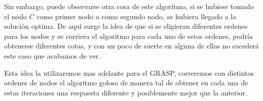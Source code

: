 Sin embargo, puede observarse otra cosa de este algoritmo, si se hubiese tomado el nodo $C$ como primer nodo o como segundo nodo, se hubiera llegado a la solución optima. De aquí surge la idea de que si se eligieran diferentes ordenes para los nodos y se corriera el algoritmo para cada uno de estos ordenes, podría obtenerse diferentes cotas, y con un poco de suerte en alguna de ellas no sucederá este caso que acabamos de ver.

Esta idea la utilizaremos mas adelante para el GRASP, correremos con distintos ordenes de nodos el algoritmo goloso de manera tal de obtener en cada una de estas iteraciones una respuesta diferente y posiblemente mejor que la anterior.